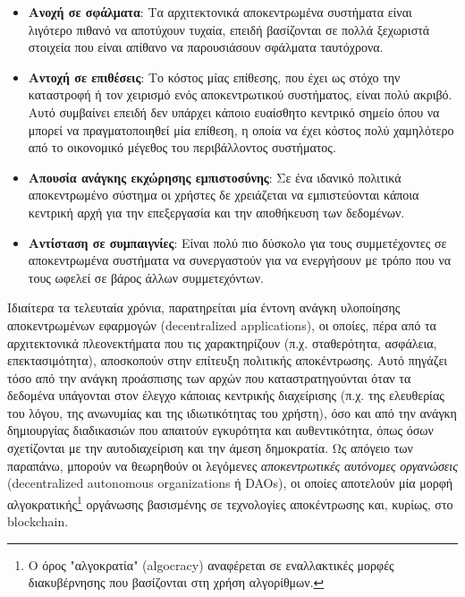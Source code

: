 \begin{itemize}
	\item \textbf{Ανοχή σε σφάλματα}: Τα αρχιτεκτονικά αποκεντρωμένα συστήματα είναι λιγότερο πιθανό να αποτύχουν τυχαία, επειδή βασίζονται σε πολλά ξεχωριστά στοιχεία που είναι απίθανο να παρουσιάσουν σφάλματα ταυτόχρονα.
	\item \textbf{Αντοχή σε επιθέσεις}: Το κόστος μίας επίθεσης, που έχει ως στόχο την καταστροφή ή τον χειρισμό ενός αποκεντρωτικού συστήματος, είναι πολύ ακριβό. Αυτό συμβαίνει επειδή δεν υπάρχει κάποιο ευαίσθητο κεντρικό σημείο όπου να μπορεί να πραγματοποιηθεί μία επίθεση, η οποία να έχει κόστος πολύ χαμηλότερο από το οικονομικό μέγεθος του περιβάλλοντος συστήματος.
	\item \textbf{Απουσία ανάγκης εκχώρησης εμπιστοσύνης}: Σε ένα ιδανικό πολιτικά αποκεντρωμένο σύστημα οι χρήστες δε χρειάζεται να εμπιστεύονται κάποια κεντρική αρχή για την επεξεργασία και την αποθήκευση των δεδομένων. 
	\item \textbf{Αντίσταση σε συμπαιγνίες}: Είναι πολύ πιο δύσκολο για τους συμμετέχοντες σε αποκεντρωμένα συστήματα να συνεργαστούν για να ενεργήσουν με τρόπο που να τους ωφελεί σε βάρος άλλων συμμετεχόντων.
\end{itemize}

Ιδιαίτερα τα τελευταία χρόνια, παρατηρείται μία έντονη ανάγκη υλοποίησης αποκεντρωμένων εφαρμογών (decentralized applications), οι οποίες, πέρα από τα αρχιτεκτονικά πλεονεκτήματα που τις χαρακτηρίζουν (π.χ. σταθερότητα, ασφάλεια, επεκτασιμότητα), αποσκοπούν στην επίτευξη πολιτικής αποκέντρωσης. Αυτό πηγάζει τόσο από την ανάγκη προάσπισης των αρχών που καταστρατηγούνται όταν τα δεδομένα υπάγονται στον έλεγχο κάποιας κεντρικής διαχείρισης (π.χ. της ελευθερίας του λόγου, της ανωνυμίας και της ιδιωτικότητας του χρήστη), όσο και από την ανάγκη δημιουργίας διαδικασιών που απαιτούν εγκυρότητα και αυθεντικότητα, όπως όσων σχετίζονται με την αυτοδιαχείριση και την άμεση δημοκρατία. Ως απόγειο των παραπάνω, μπορούν να θεωρηθούν οι λεγόμενες \textit{αποκεντρωτικές αυτόνομες οργανώσεις} (decentralized autonomous organizations ή DAOs), οι οποίες αποτελούν μία μορφή αλγοκρατικής\footnote{Ο όρος "αλγοκρατία" (algocracy) αναφέρεται σε εναλλακτικές μορφές διακυβέρνησης που βασίζονται στη χρήση αλγορίθμων.\cite{1.2-virtual-migration}} οργάνωσης βασισμένης σε τεχνολογίες αποκέντρωσης και, κυρίως, στο blockchain.
